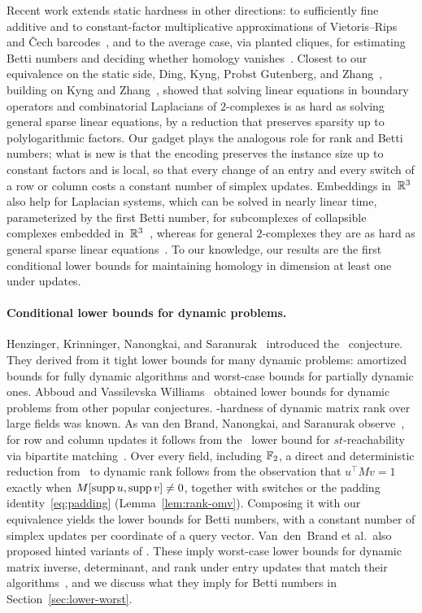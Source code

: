 Recent work extends static hardness in other directions: to sufficiently fine additive and to constant-factor multiplicative approximations of Vietoris--Rips and \v{C}ech barcodes~\cite{KM26}, and to the average case, via planted cliques, for estimating Betti numbers and deciding whether homology vanishes~\cite{SSW26}.
Closest to our equivalence on the static side, Ding, Kyng, Probst Gutenberg, and Zhang~\cite{DKPZ22}, building on Kyng and Zhang~\cite{KZ20}, showed that solving linear equations in boundary operators and combinatorial Laplacians of $2$-complexes is as hard as solving general sparse linear equations, by a reduction that preserves sparsity up to polylogarithmic factors.
Our gadget plays the analogous role for rank and Betti numbers; what is new is that the encoding preserves the instance size up to constant factors and is local, so that every change of an entry and every switch of a row or column costs a constant number of simplex updates.
Embeddings in~$\mathbb{R}^3$ also help for Laplacian systems, which can be solved in nearly linear time, parameterized by the first Betti number, for subcomplexes of collapsible complexes embedded in~$\mathbb{R}^3$~\cite{BN22}, whereas for general $2$-complexes they are as hard as general sparse linear equations~\cite{DKPZ22}.
To our knowledge, our results are the first conditional lower bounds for maintaining homology in dimension at least one under updates.

\paragraph{Conditional lower bounds for dynamic problems.}
Henzinger, Krinninger, Nanongkai, and Saranurak~\cite{HKNS15} introduced the \OMv\ conjecture.
They derived from it tight lower bounds for many dynamic problems: amortized bounds for fully dynamic algorithms and worst-case bounds for partially dynamic ones.
Abboud and Vassilevska Williams~\cite{AV14} obtained lower bounds for dynamic problems from other popular conjectures.
\OMv-hardness of dynamic matrix rank over large fields was known.
As van den Brand, Nanongkai, and Saranurak observe~\cite[Theorem~E.5]{vdBNS19full}, for row and column updates it follows from the \OMv\ lower bound for $st$-reachability~\cite{HKNS15} via bipartite matching~\cite{AV14}.
Over every field, including $\mathbb{F}_2$, a direct and deterministic reduction from \OuMv\ to dynamic rank follows from the observation that $u^{\top}Mv=1$ exactly when $M[\operatorname{supp} u,\operatorname{supp} v]\ne0$, together with switches or the padding identity~\eqref{eq:padding} (Lemma~\ref{lem:rank-omv}).
Composing it with our equivalence yields the lower bounds for Betti numbers, with a constant number of simplex updates per coordinate of a query vector.
Van~den~Brand et al.\ also proposed hinted variants of \OMv.
These imply worst-case lower bounds for dynamic matrix inverse, determinant, and rank under entry updates that match their algorithms~\cite[Corollary~5.15]{vdBNS19full}, and we discuss what they imply for Betti numbers in Section~\ref{sec:lower-worst}.

